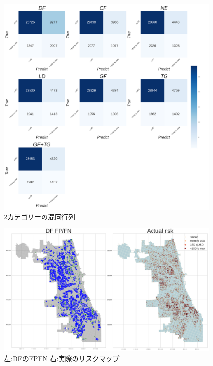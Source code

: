 \begin{figure}
  \centering %
  \includegraphics[scale=0.16]{./non-crime-timeseries-fig/non_crime_timeseries_two_cm.png}
  \caption{2カテゴリーの混同行列}
  \label{fig:non-crime-timeseries-2cm}
\end{figure}
\begin{figure}
  \centering %
  \includegraphics[scale=0.25]{./non-crime-timeseries-fig/DF_fnp.png}
  \caption{左:DFのFPFN 右:実際のリスクマップ}
  \label{fig:non-crime-timeseries-df-fnp}
\end{figure}

